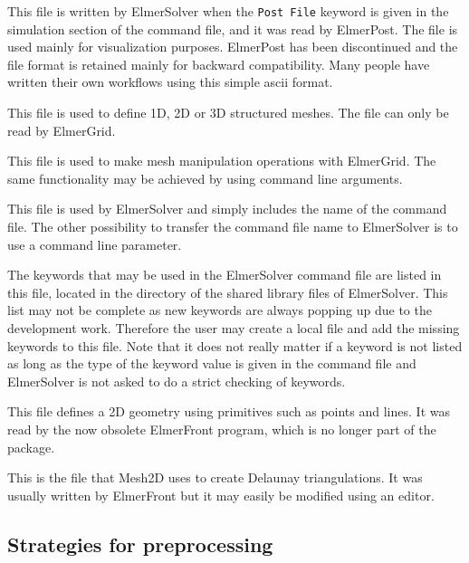 This file is written by ElmerSolver when the \texttt{Post File} keyword is given in the simulation
section of the command file, and it was read by ElmerPost.
The file is used mainly for visualization purposes.
ElmerPost has been discontinued and the file format is retained mainly for backward compatibility.
Many people have written their own workflows using this simple ascii format. 

This file is used to define 1D, 2D or 3D structured meshes. 
The file can only be read by ElmerGrid.

This file is used to make mesh manipulation operations with ElmerGrid. The same functionality 
may be achieved by using command line arguments.

This file is used by ElmerSolver and simply includes the name of the command file.
The other possibility to transfer the command file name to ElmerSolver is to use 
a command line parameter.

The keywords that may be used in the ElmerSolver command file are listed in this file, located 
in the directory of the shared library files of ElmerSolver. This list may not be complete as new keywords 
are always popping up due to the development work. Therefore the user may create a local file and 
add the missing keywords to this file. Note that it does not really matter if a keyword is not listed
as long as the type of the keyword value is given in the command file and ElmerSolver is not asked to
do a strict checking of keywords. 

This file defines a 2D geometry using primitives such as points and lines.
It was read by the now obsolete ElmerFront program, which is no longer part of the package.

This is the file that Mesh2D uses to create Delaunay triangulations. 
It was usually written by ElmerFront but it may easily be modified using an editor.


\sifend 


\subsection{Strategies for preprocessing}

